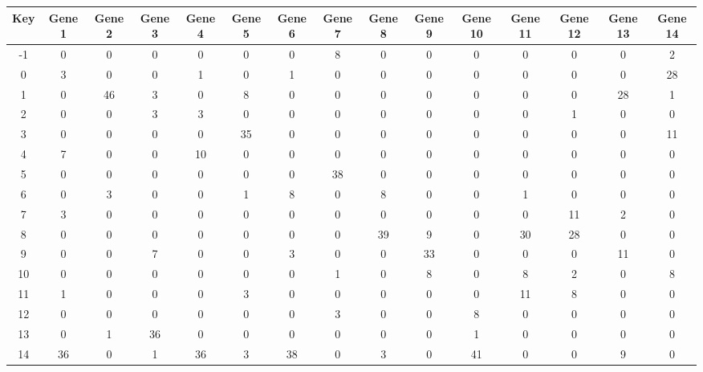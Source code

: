 \begin{tabular}{|c|c|c|c|c|c|c|c|c|c|c|c|c|c|c|}
\hline
Key & Gene 1 & Gene 2 & Gene 3 & Gene 4 & Gene 5 & Gene 6 & Gene 7 & Gene 8 & Gene 9 & Gene 10 & Gene 11 & Gene 12 & Gene 13 & Gene 14 \\
\hline
-1 & 0 & 0 & 0 & 0 & 0 & 0 & 8 & 0 & 0 & 0 & 0 & 0 & 0 & 2 \\
0 & 3 & 0 & 0 & 1 & 0 & 1 & 0 & 0 & 0 & 0 & 0 & 0 & 0 & 28 \\
1 & 0 & 46 & 3 & 0 & 8 & 0 & 0 & 0 & 0 & 0 & 0 & 0 & 28 & 1 \\
2 & 0 & 0 & 3 & 3 & 0 & 0 & 0 & 0 & 0 & 0 & 0 & 1 & 0 & 0 \\
3 & 0 & 0 & 0 & 0 & 35 & 0 & 0 & 0 & 0 & 0 & 0 & 0 & 0 & 11 \\
4 & 7 & 0 & 0 & 10 & 0 & 0 & 0 & 0 & 0 & 0 & 0 & 0 & 0 & 0 \\
5 & 0 & 0 & 0 & 0 & 0 & 0 & 38 & 0 & 0 & 0 & 0 & 0 & 0 & 0 \\
6 & 0 & 3 & 0 & 0 & 1 & 8 & 0 & 8 & 0 & 0 & 1 & 0 & 0 & 0 \\
7 & 3 & 0 & 0 & 0 & 0 & 0 & 0 & 0 & 0 & 0 & 0 & 11 & 2 & 0 \\
8 & 0 & 0 & 0 & 0 & 0 & 0 & 0 & 39 & 9 & 0 & 30 & 28 & 0 & 0 \\
9 & 0 & 0 & 7 & 0 & 0 & 3 & 0 & 0 & 33 & 0 & 0 & 0 & 11 & 0 \\
10 & 0 & 0 & 0 & 0 & 0 & 0 & 1 & 0 & 8 & 0 & 8 & 2 & 0 & 8 \\
11 & 1 & 0 & 0 & 0 & 3 & 0 & 0 & 0 & 0 & 0 & 11 & 8 & 0 & 0 \\
12 & 0 & 0 & 0 & 0 & 0 & 0 & 3 & 0 & 0 & 8 & 0 & 0 & 0 & 0 \\
13 & 0 & 1 & 36 & 0 & 0 & 0 & 0 & 0 & 0 & 1 & 0 & 0 & 0 & 0 \\
14 & 36 & 0 & 1 & 36 & 3 & 38 & 0 & 3 & 0 & 41 & 0 & 0 & 9 & 0 \\
\hline
\end{tabular}